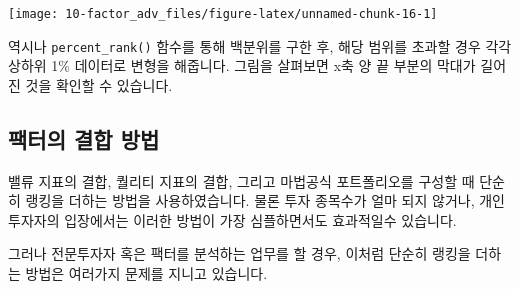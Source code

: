 \documentclass[12pt,]{book}
\newenvironment{Shaded}{\begin{snugshade}}{\end{snugshade}}
\newcommand{\DataTypeTok}[1]{\textcolor[rgb]{0.13,0.29,0.53}{#1}}
\newcommand{\FloatTok}[1]{\textcolor[rgb]{0.00,0.00,0.81}{#1}}
\newcommand{\KeywordTok}[1]{\textcolor[rgb]{0.13,0.29,0.53}{\textbf{#1}}}
\newcommand{\NormalTok}[1]{#1}
\newcommand{\OperatorTok}[1]{\textcolor[rgb]{0.81,0.36,0.00}{\textbf{#1}}}
\newcommand{\OtherTok}[1]{\textcolor[rgb]{0.56,0.35,0.01}{#1}}
\newcommand{\StringTok}[1]{\textcolor[rgb]{0.31,0.60,0.02}{#1}}
\begin{document}
\begin{Shaded}
\end{Shaded}

\begin{center}\texttt{[image: 10-factor\_adv\_files/figure-latex/unnamed-chunk-16-1]} \end{center}

역시나 \texttt{percent\_rank()} 함수를 통해 백분위를 구한 후, 해당 범위를 초과할 경우 각각 상하위 1\% 데이터로 변형을 해줍니다. 그림을 살펴보면 x축 양 끝 부분의 막대가 길어진 것을 확인할 수 있습니다.

\hypertarget{section-66}{%
\subsection{팩터의 결합 방법}\label{section-66}}

밸류 지표의 결합, 퀄리티 지표의 결합, 그리고 마법공식 포트폴리오를 구성할 때 단순히 랭킹을 더하는 방법을 사용하였습니다. 물론 투자 종목수가 얼마 되지 않거나, 개인투자자의 입장에서는 이러한 방법이 가장 심플하면서도 효과적일수 있습니다.

그러나 전문투자자 혹은 팩터를 분석하는 업무를 할 경우, 이처럼 단순히 랭킹을 더하는 방법은 여러가지 문제를 지니고 있습니다.
\end{document}
